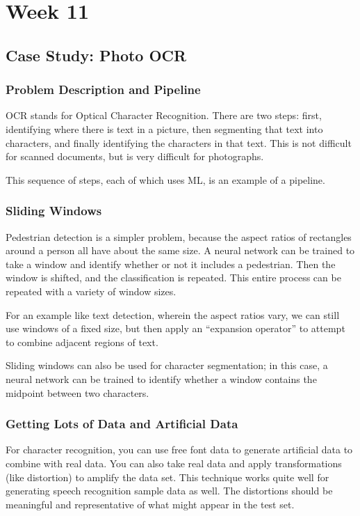 \chapter{Week 11}

\section{Case Study: Photo OCR}

\subsection{Problem Description and Pipeline}

OCR stands for Optical Character Recognition.
There are two steps: first, identifying where there is text in a picture,
then segmenting that text into characters,
and finally identifying the characters in that text.
This is not difficult for scanned documents, but is very difficult for photographs.

This sequence of steps, each of which uses ML, is an example of a pipeline.

\subsection{Sliding Windows}

Pedestrian detection is a simpler problem, because the aspect ratios of rectangles
around a person all have about the same size.
A neural network can be trained to take a window and identify whether or not it
includes a pedestrian.
Then the window is shifted, and the classification is repeated.
This entire process can be repeated with a variety of window sizes.

For an example like text detection, wherein the aspect ratios vary, we can still
use windows of a fixed size, but then apply an ``expansion operator'' to attempt
to combine adjacent regions of text.

Sliding windows can also be used for character segmentation; in this case, a neural
network can be trained to identify whether a window contains the midpoint between
two characters.

\subsection{Getting Lots of Data and Artificial Data}

For character recognition, you can use free font data to generate artificial data
to combine with real data.
You can also take real data and apply transformations (like distortion) to amplify the data set.
This technique works quite well for generating speech recognition sample data as well.
The distortions should be meaningful and representative of what might appear in the test set.

